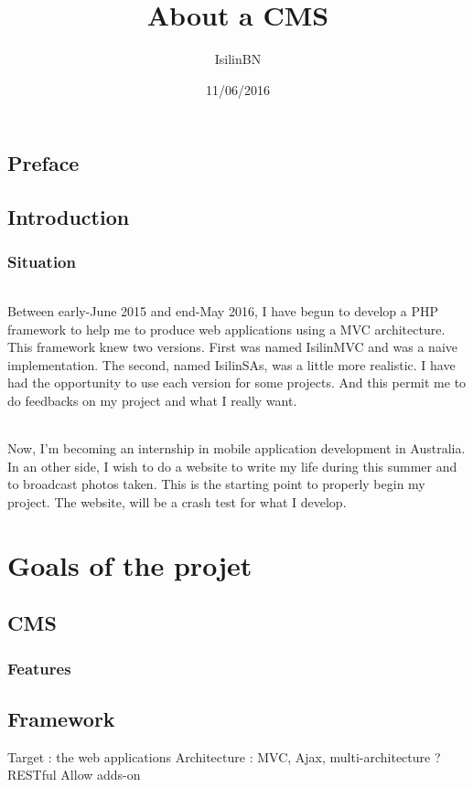 \documentclass[a4paper, 12pt, openany]{book}
\title{About a CMS}
\author{IsilinBN}
\date{11/06/2016}
\begin{document}
\maketitle
\tableofcontents
\frontmatter
\chapter{Preface}
\chapter{Introduction}
\section{Situation}
\paragraph{}
Between early-June 2015 and end-May 2016, I have begun to develop a PHP framework to help me to produce web applications using a MVC architecture. This framework knew two versions. First was named IsilinMVC and was a naive implementation. The second, named IsilinSAs, was a little more realistic.
I have had the opportunity to use each version for some projects. And this permit me to do feedbacks on my project and what I really want.
\paragraph{}
Now, I\rq{}m becoming an internship in mobile application development in Australia. In an other side, I wish to do a website to write my life during this summer and to broadcast photos taken.
This is the starting point to properly begin my project. The website, will be a crash test for what I develop.
\mainmatter
\part{Goals of the projet}
\chapter{CMS}
\section{Features}
\chapter{Framework}
Target : the web applications
Architecture : MVC, Ajax, multi-architecture ?
RESTful
Allow adds-on
\end{document}
